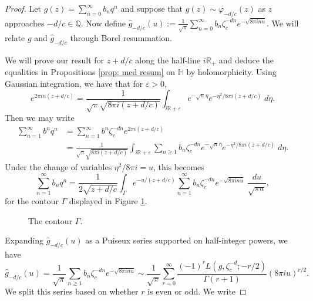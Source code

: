 \documentclass[12pt]{amsart}
\theoremstyle{definition}
\theoremstyle{plain}
\numberwithin{equation}{section}
\begin{document}
\begin{proof}
Let $g(z)= \sum_{n=0}^\infty b_n q^n$ and suppose that $g(z) \sim \varphi_{-d/c}(z)$ as $z$ approaches $-d/c \in \mathbb{Q}$.
Now define $\widehat{g}_{-d/c}(u) := \frac{1}{\sqrt{\pi}}\sum_{n =0}^\infty b_n \zeta_c^{-dn}  e^{-\sqrt{8\pi i  nu}}$. We will relate $g$ and $\widehat{g}_{-d/c}$ through Borel resummation.

We will prove our result for $z+d/c$ along the half-line $i\mathbb{R}_+$ and deduce the equalities in Propositions \ref{prop: med resum} on $\mathbb{H}$ by holomorphicity. Using Gaussian integration, we have that for $\varepsilon >0$,
\[e^{2\pi i n (z+d/c)} = \frac{1}{\sqrt{\pi}\sqrt{8\pi i (z+d/c)}} \int_{i\mathbb{R}+\varepsilon}e^{-\sqrt{n}\eta} e^{-\eta^2/8\pi i (z+d/c)}\;d\eta.
\]
Then we may write 
\begin{align*}
\sum_{n=1}^\infty b^n q^n &= \sum_{n = 1}^\infty b^n \zeta_c^{-dn} e^{2\pi i (z+d/c)} \\&=  \frac{1}{\sqrt{\pi}\sqrt{8\pi i (z+d/c)}}\int_{i\mathbb{R}+\varepsilon}\sum_{n \geq 1} b_n\zeta_c^{-dn} e^{-\sqrt{n}\eta} e^{-\eta^2/8\pi i (z+d/c)}\;d\eta.
\end{align*}
Under the change of variables $\eta^2/8\pi i =u$, this becomes
\[\sum_{n = 1}^\infty b_n q^n =  \frac{1}{2\sqrt{z+d/c}}\int_{\Gamma}e^{-u/(z+d/c)} \sum_{n = 1}^\infty b_n\zeta_c^{-dn} e^{-\sqrt{8\pi i nu}} \;\frac{du}{\sqrt{\pi u}},
\]
for the contour $\Gamma$ displayed in Figure \ref{fig: contours}.
\begin{figure}
	\caption{The contour $\Gamma$.}
  \label{fig: contours}
\end{figure}
Expanding $\widehat{g}_{-d/c}(u)$ as a Puiseux series supported on half-integer powers, we have 
\begin{equation}\label{egn: g hat asymptotic} 
\widehat{g}_{-d/c}(u) = \frac{1}{\sqrt{\pi}}\sum_{n \geq 1} b_n\zeta_c^{-dn} e^{-\sqrt{8\pi i nu}} \sim \frac{1}{\sqrt{\pi }} \sum_{r=0}^\infty \frac{(-1)^r L(g, \zeta_c^{-d};-r/2)}{\Gamma(r+1)}(8\pi iu)^{r/2}.
\end{equation}
We split this series based on whether $r$ is even or odd. We write

\end{proof}
\end{document}
